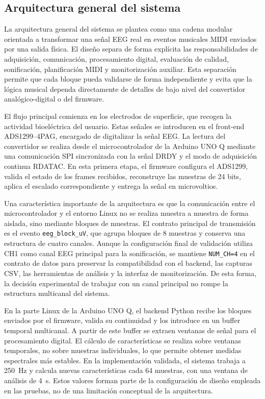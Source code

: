 \documentclass[../main.tex]{subfiles}
\begin{document}
\subsection{Arquitectura general del sistema}

La arquitectura general del sistema se plantea como una cadena modular orientada a transformar una señal EEG real en eventos musicales MIDI enviados por una salida física. El diseño separa de forma explícita las responsabilidades de adquisición, comunicación, procesamiento digital, evaluación de calidad, sonificación, planificación MIDI y monitorización auxiliar. Esta separación permite que cada bloque pueda validarse de forma independiente y evita que la lógica musical dependa directamente de detalles de bajo nivel del convertidor analógico-digital o del firmware.

El flujo principal comienza en los electrodos de superficie, que recogen la actividad bioeléctrica del usuario. Estas señales se introducen en el front-end ADS1299--4PAG, encargado de digitalizar la señal EEG. La lectura del convertidor se realiza desde el microcontrolador de la Arduino UNO Q mediante una comunicación SPI sincronizada con la señal DRDY y el modo de adquisición continua RDATAC. En esta primera etapa, el firmware configura el ADS1299, valida el estado de los frames recibidos, reconstruye las muestras de 24 bits, aplica el escalado correspondiente y entrega la señal en microvoltios.

Una característica importante de la arquitectura es que la comunicación entre el microcontrolador y el entorno Linux no se realiza muestra a muestra de forma aislada, sino mediante bloques de muestras. El contrato principal de transmisión es el evento \texttt{eeg\_block\_uV}, que agrupa bloques de 8 muestras y conserva una estructura de cuatro canales. Aunque la configuración final de validación utiliza CH1 como canal EEG principal para la sonificación, se mantiene \texttt{NUM\_CH=4} en el contrato de datos para preservar la compatibilidad con el backend, las capturas CSV, las herramientas de análisis y la interfaz de monitorización. De esta forma, la decisión experimental de trabajar con un canal principal no rompe la estructura multicanal del sistema.

En la parte Linux de la Arduino UNO Q, el backend Python recibe los bloques enviados por el firmware, valida su continuidad y los introduce en un buffer temporal multicanal. A partir de este buffer se extraen ventanas de señal para el procesamiento digital. El cálculo de características se realiza sobre ventanas temporales, no sobre muestras individuales, lo que permite obtener medidas espectrales más estables. En la implementación validada, el sistema trabaja a \SI{250}{\hertz} y calcula nuevas características cada 64 muestras, con una ventana de análisis de \SI{4}{\second}. Estos valores forman parte de la configuración de diseño empleada en las pruebas, no de una limitación conceptual de la arquitectura.
\end{document}
